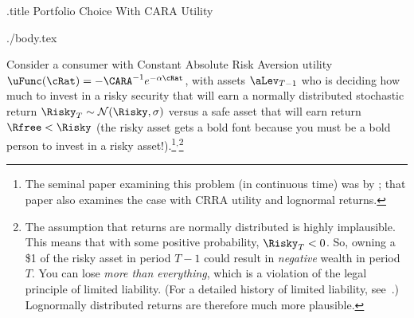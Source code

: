 \documentclass{handout}
\begin{document}
 

\handoutHeader

\begin{verbatimwrite}{\jobname.title}
Portfolio Choice With CARA Utility
\end{verbatimwrite}

\medskip\medskip

\handoutNameMake

\renewcommand{\tilde}{\null} %

\begin{verbatimwrite}{./body.tex}

Consider a consumer with Constant Absolute Risk Aversion
utility
$\uFunc(\cRat) = -\CARA^{-1} e^{-\alpha \cRat_{}}$, with assets
$\aLev_{T-1}$ who is deciding how much to invest in a risky security that
will earn a normally distributed stochastic return $\Risky_{T} \sim
\mathcal{N}(\Risky,\sigma)$ versus a safe asset that will earn return
$\Rfree < \Risky$ (the risky asset gets a bold font because you must be a bold person to invest in a risky asset!).\footnote{The seminal paper examining this problem (in
  continuous time) was by \cite{merton:restat}; that paper also
  examines the case with CRRA utility and lognormal
  returns.}$^{,}$\footnote{The assumption that returns are normally
  distributed is highly implausible.  This means that with some
  positive probability, $\Risky_{T} < 0$.  So, owning a \$1 of the
  risky asset in period $T-1$ could result in {\it negative} wealth in
  period $T$.  You can lose {\it more than everything}, which is a
  violation of the legal principle of limited liability.  (For a
  detailed history of limited liability,
  see~\cite{micklethwaitWooldridgeCompany}.)  Lognormally distributed
  returns are therefore much more plausible.}


\end{verbatimwrite}
\end{document}
